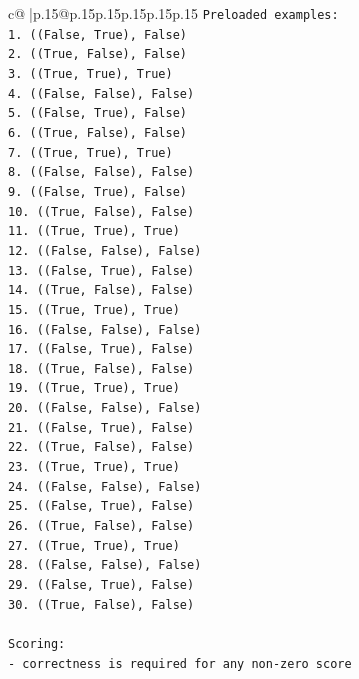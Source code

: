 \documentclass{article}
\begin{document}
{\begin{supertabular}{c@{$\;$}|p{.15\linewidth}@{}p{.15\linewidth}p{.15\linewidth}p{.15\linewidth}p{.15\linewidth}p{.15\linewidth}}
{{{\texttt{Preloaded examples:} \\
\texttt{1. ((False, True), False)} \\
\texttt{2. ((True, False), False)} \\
\texttt{3. ((True, True), True)} \\
\texttt{4. ((False, False), False)} \\
\texttt{5. ((False, True), False)} \\
\texttt{6. ((True, False), False)} \\
\texttt{7. ((True, True), True)} \\
\texttt{8. ((False, False), False)} \\
\texttt{9. ((False, True), False)} \\
\texttt{10. ((True, False), False)} \\
\texttt{11. ((True, True), True)} \\
\texttt{12. ((False, False), False)} \\
\texttt{13. ((False, True), False)} \\
\texttt{14. ((True, False), False)} \\
\texttt{15. ((True, True), True)} \\
\texttt{16. ((False, False), False)} \\
\texttt{17. ((False, True), False)} \\
\texttt{18. ((True, False), False)} \\
\texttt{19. ((True, True), True)} \\
\texttt{20. ((False, False), False)} \\
\texttt{21. ((False, True), False)} \\
\texttt{22. ((True, False), False)} \\
\texttt{23. ((True, True), True)} \\
\texttt{24. ((False, False), False)} \\
\texttt{25. ((False, True), False)} \\
\texttt{26. ((True, False), False)} \\
\texttt{27. ((True, True), True)} \\
\texttt{28. ((False, False), False)} \\
\texttt{29. ((False, True), False)} \\
\texttt{30. ((True, False), False)} \\
\\ 
\texttt{Scoring:} \\
\texttt{{-} correctness is required for any non{-}zero score} \\
}}}
\end{supertabular}}
\end{document}
